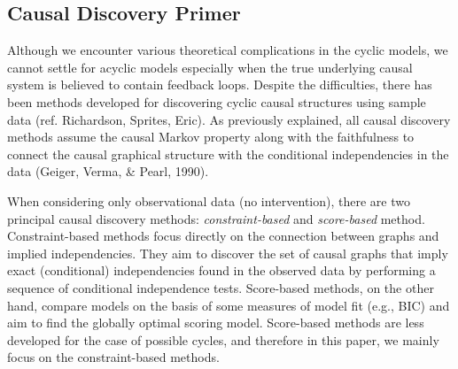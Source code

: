 \documentclass[11pt]{article}
\theoremstyle{definition}
\begin{document}
\subsection{Causal Discovery Primer}
Although we encounter various theoretical complications in the cyclic models, we cannot settle for acyclic models especially when the true underlying causal system is believed to contain feedback loops. Despite the difficulties, there has been methods developed for discovering cyclic causal structures using sample data (ref. Richardson, Sprites, Eric).
As previously explained, all causal discovery methods assume the causal Markov property along with the faithfulness to connect the causal graphical structure with the conditional independencies in the data (Geiger, Verma, \& Pearl, 1990).

When considering only observational data (no intervention), there are two principal causal discovery methods: \textit{constraint-based} and \textit{score-based} method. Constraint-based methods focus directly on the connection between graphs and implied independencies. They aim to discover the set of causal graphs that imply exact (conditional) independencies found in the observed data by performing a sequence of conditional independence tests. Score-based methods, on the other hand, compare models on the basis of some measures of model fit (e.g., BIC) and aim to find the globally optimal scoring model. Score-based methods are less developed for the case of possible cycles, and therefore in this paper, we mainly focus on the constraint-based methods.
\end{document}
